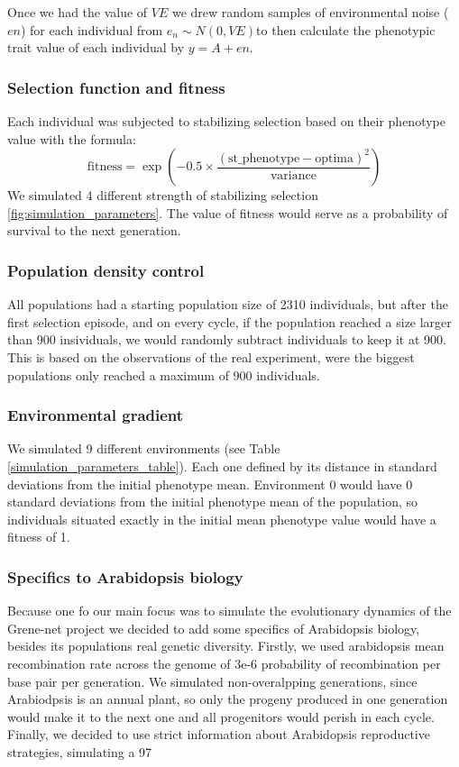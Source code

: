 \documentclass{article}
\begin{document}
Once we had the value of \( VE \) we drew random samples of environmental noise (\( en \)) for each individual from \( e_n \sim N(0, VE) \)to then calculate the phenotypic trait value of each individual by \( y = A + en \).

\subsubsection{Selection function and fitness}
Each individual was subjected to stabilizing selection based on their phenotype value with the formula:
\[
\text{fitness} = \exp\left(-0.5 \times \frac{(\text{st\_phenotype} - \text{optima})^2}{\text{variance}}\right)
\]
We simulated 4 different strength of stabilizing selection \ref{fig:simulation_parameters}. The value of fitness would serve as a probability of survival to the next generation. 

\subsubsection{Population density control}
All populations had a starting population size of 2310 individuals, but after the first selection episode, and on every cycle, if the population reached a size larger than 900 insividuals, we would randomly subtract individuals to keep it at 900. This is based on the observations of the real experiment, were the biggest populations only reached a maximum of 900 individuals. 

\subsubsection{Environmental gradient}
We simulated 9 different environments (see Table \ref{simulation_parameters_table}). Each one defined by its distance in standard deviations from the initial phenotype mean. Environment 0 would have 0 standard deviations from the initial phenotype mean of the population, so individuals situated exactly in the initial mean phenotype value would have a fitness of 1. 

\subsubsection{Specifics to Arabidopsis biology}
Because one fo our main focus was to simulate the evolutionary dynamics of the Grene-net project we decided to add some specifics of Arabidopsis biology, besides its populations real genetic diversity. Firstly, we used arabidopsis mean recombination rate across the genome of 3e-6 probability of recombination per base pair per generation. We simulated non-overalpping generations, since Arabiodpsis is an annual plant, so only the progeny produced in one generation would make it to the next one and all progenitors would perish in each cycle. Finally, we decided to use strict information about Arabidopsis reproductive strategies, simulating a 97%
\end{document}
